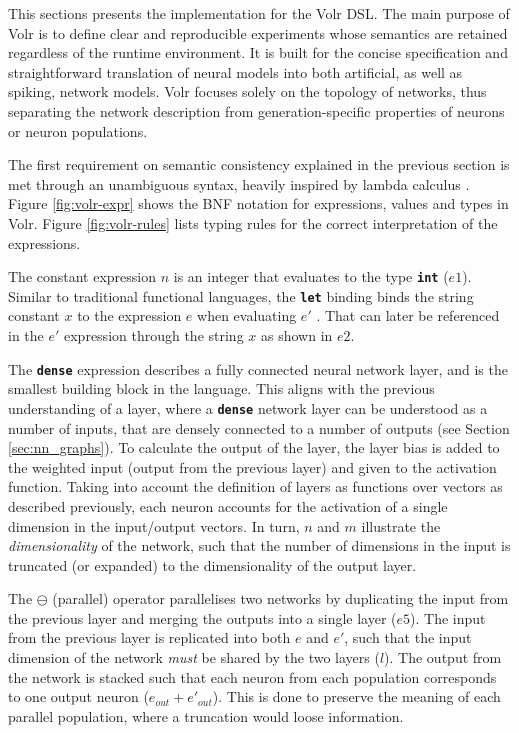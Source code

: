 This sections presents the implementation for the Volr \gls{DSL}. 
The main purpose of Volr is to define clear and reproducible
experiments whose semantics are retained regardless of
the runtime environment.
It is built for the concise specification and straightforward
translation of neural models into both artificial, as well as
spiking, network models.
Volr focuses solely on the topology of networks, thus
separating the network description from generation-specific
properties of neurons or neuron populations.

The first requirement on semantic consistency explained in the previous section is met through an unambiguous
syntax, heavily inspired by lambda calculus \cite{Pierce2002}.
Figure \ref{fig:volr-expr} shows the BNF notation for expressions, values and types
in Volr. 
Figure \ref{fig:volr-rules} lists typing rules for the correct
interpretation of the expressions.




The constant expression $n$ is an integer that evaluates to the type 
\texttt{\textbf{int}} ($e1$). 
Similar to traditional functional languages, the \texttt{\textbf{let}} binding
binds the string constant $x$ to the expression $e$ when evaluating
$e'$ \cite{Pierce2002}.
That can later be referenced in the $e'$ expression 
through the string $x$ as shown in $e2$.

The \texttt{\textbf{dense}} expression describes a fully connected
neural network layer, and is the smallest building block in the language.
This aligns with the previous understanding of a layer, where
a \texttt{\textbf{dense}} network layer can be understood as a number of inputs,
that are densely connected to a number of outputs (see Section
\ref{sec:nn_graphs}).
To calculate the output of the layer, the layer bias is added to the
weighted input (output from the previous layer) and given 
to the activation function.
Taking into account the definition of layers as functions over vectors as described previously, each neuron 
accounts for the activation of a single dimension in the input/output vectors.
In turn, $n$ and $m$ illustrate the \textit{dimensionality} of the network,
such that the number of dimensions in the input is truncated (or expanded) to
the dimensionality of the output layer.

The $\ominus$ (parallel) operator parallelises two networks by duplicating
the input from the previous layer and merging the outputs into a single
layer ($e5$).
The input from the previous layer is replicated into both $e$ and $e'$, such
that the input dimension of the network \textit{must} be shared by the two layers ($l$).
The output from the network is stacked such that each neuron from each
population corresponds to one output neuron ($e_{out} + e'_{out}$).
This is done to preserve the meaning of each parallel population, where
a truncation would loose information.

